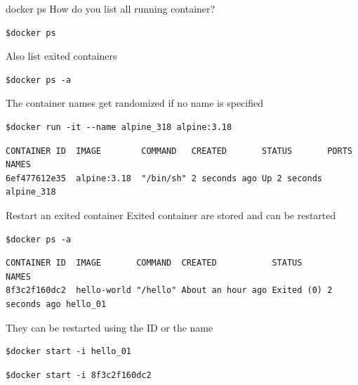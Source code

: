 \documentclass[12pt]{beamer}
\begin{document}
\begin{frame}[fragile]{docker ps}
    How do you list all running container?
    \begin{lstlisting}[language=OwnBash, basicstyle=\small]
$docker ps
    \end{lstlisting}
    Also list exited containers
    \begin{lstlisting}[language=OwnBash, basicstyle=\small]
$docker ps -a
    \end{lstlisting}
    The container names get randomized if no name is specified
    \begin{lstlisting}[language=OwnBash, basicstyle=\small]
$docker run -it --name alpine_318 alpine:3.18
    \end{lstlisting}
    \begin{lstlisting}[language=OwnBash, basicstyle=\tiny]
CONTAINER ID  IMAGE        COMMAND   CREATED       STATUS       PORTS NAMES
6ef477612e35  alpine:3.18  "/bin/sh" 2 seconds ago Up 2 seconds       alpine_318
    \end{lstlisting}
\end{frame}

\begin{frame}[fragile]{Restart an exited container}
    Exited container are stored and can be restarted\\
    \begin{lstlisting}[language=OwnBash, basicstyle=\small]
$docker ps -a
    \end{lstlisting}
    \begin{lstlisting}[language=OwnBash, basicstyle=\tiny]
CONTAINER ID  IMAGE       COMMAND  CREATED           STATUS                   NAMES             
8f3c2f160dc2  hello-world "/hello" About an hour ago Exited (0) 2 seconds ago hello_01
    \end{lstlisting}
    They can be restarted using the ID or the name
    \begin{lstlisting}[language=OwnBash, basicstyle=\small]
$docker start -i hello_01
    \end{lstlisting}
    \begin{lstlisting}[language=OwnBash, basicstyle=\small]
$docker start -i 8f3c2f160dc2
    \end{lstlisting}
\end{frame}
\end{document}
